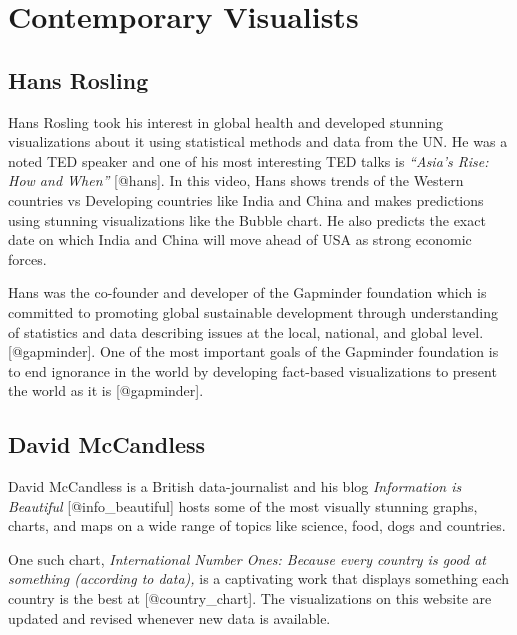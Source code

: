 \documentclass[]{book}
\theoremstyle{definition}
\theoremstyle{definition}
\theoremstyle{definition}
\theoremstyle{remark}
\begin{document}
\section{Contemporary Visualists}\label{contemporary-visualists}

\subsection{Hans Rosling}\label{hans-rosling}

Hans Rosling took his interest in global health and developed stunning
visualizations about it using statistical methods and data from the UN.
He was a noted TED speaker and one of his most interesting TED talks is
\emph{``Asia's Rise: How and When''} {[}@hans{]}. In this video, Hans
shows trends of the Western countries vs Developing countries like India
and China and makes predictions using stunning visualizations like the
Bubble chart. He also predicts the exact date on which India and China
will move ahead of USA as strong economic forces.

Hans was the co-founder and developer of the Gapminder foundation which
is committed to promoting global sustainable development through
understanding of statistics and data describing issues at the local,
national, and global level. {[}@gapminder{]}. One of the most important
goals of the Gapminder foundation is to end ignorance in the world by
developing fact-based visualizations to present the world as it is
{[}@gapminder{]}.

\subsection{David McCandless}\label{david-mccandless}

David McCandless is a British data-journalist and his blog
\emph{Information is Beautiful} {[}@info\_beautiful{]} hosts some of the
most visually stunning graphs, charts, and maps on a wide range of
topics like science, food, dogs and countries.

One such chart, \emph{International Number Ones: Because every country
is good at something (according to data),} is a captivating work that
displays something each country is the best at {[}@country\_chart{]}.
The visualizations on this website are updated and revised whenever new
data is available.
\end{document}
